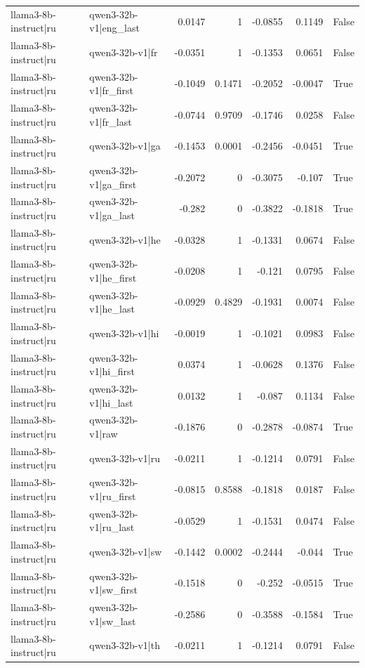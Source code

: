 \begin{table}
\begin{tabular}{l l r r r r l}
llama3-8b-instruct|ru & qwen3-32b-v1|eng_last & 0.0147 & 1 & -0.0855 & 0.1149 & False \\
llama3-8b-instruct|ru & qwen3-32b-v1|fr & -0.0351 & 1 & -0.1353 & 0.0651 & False \\
llama3-8b-instruct|ru & qwen3-32b-v1|fr_first & -0.1049 & 0.1471 & -0.2052 & -0.0047 & True \\
llama3-8b-instruct|ru & qwen3-32b-v1|fr_last & -0.0744 & 0.9709 & -0.1746 & 0.0258 & False \\
llama3-8b-instruct|ru & qwen3-32b-v1|ga & -0.1453 & 0.0001 & -0.2456 & -0.0451 & True \\
llama3-8b-instruct|ru & qwen3-32b-v1|ga_first & -0.2072 & 0 & -0.3075 & -0.107 & True \\
llama3-8b-instruct|ru & qwen3-32b-v1|ga_last & -0.282 & 0 & -0.3822 & -0.1818 & True \\
llama3-8b-instruct|ru & qwen3-32b-v1|he & -0.0328 & 1 & -0.1331 & 0.0674 & False \\
llama3-8b-instruct|ru & qwen3-32b-v1|he_first & -0.0208 & 1 & -0.121 & 0.0795 & False \\
llama3-8b-instruct|ru & qwen3-32b-v1|he_last & -0.0929 & 0.4829 & -0.1931 & 0.0074 & False \\
llama3-8b-instruct|ru & qwen3-32b-v1|hi & -0.0019 & 1 & -0.1021 & 0.0983 & False \\
llama3-8b-instruct|ru & qwen3-32b-v1|hi_first & 0.0374 & 1 & -0.0628 & 0.1376 & False \\
llama3-8b-instruct|ru & qwen3-32b-v1|hi_last & 0.0132 & 1 & -0.087 & 0.1134 & False \\
llama3-8b-instruct|ru & qwen3-32b-v1|raw & -0.1876 & 0 & -0.2878 & -0.0874 & True \\
llama3-8b-instruct|ru & qwen3-32b-v1|ru & -0.0211 & 1 & -0.1214 & 0.0791 & False \\
llama3-8b-instruct|ru & qwen3-32b-v1|ru_first & -0.0815 & 0.8588 & -0.1818 & 0.0187 & False \\
llama3-8b-instruct|ru & qwen3-32b-v1|ru_last & -0.0529 & 1 & -0.1531 & 0.0474 & False \\
llama3-8b-instruct|ru & qwen3-32b-v1|sw & -0.1442 & 0.0002 & -0.2444 & -0.044 & True \\
llama3-8b-instruct|ru & qwen3-32b-v1|sw_first & -0.1518 & 0 & -0.252 & -0.0515 & True \\
llama3-8b-instruct|ru & qwen3-32b-v1|sw_last & -0.2586 & 0 & -0.3588 & -0.1584 & True \\
llama3-8b-instruct|ru & qwen3-32b-v1|th & -0.0211 & 1 & -0.1214 & 0.0791 & False \\

\end{tabular}
\end{table}
